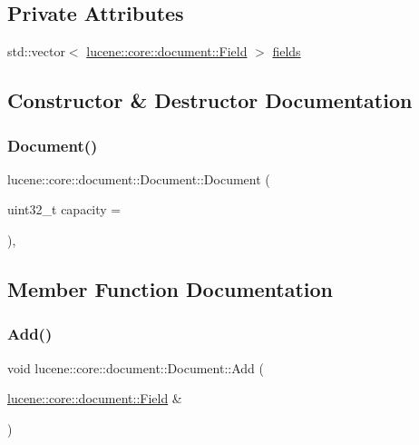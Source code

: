 \subsection*{Private Attributes}
\begin{DoxyCompactItemize}
\item 
std\+::vector$<$ \mbox{\hyperlink{classlucene_1_1core_1_1document_1_1Field}{lucene\+::core\+::document\+::\+Field}} $>$ \mbox{\hyperlink{classlucene_1_1core_1_1document_1_1Document_af9530ebe88523c7b14063d7efeccf987}{fields}}
\end{DoxyCompactItemize}


\subsection{Constructor \& Destructor Documentation}
\mbox{\label{classlucene_1_1core_1_1document_1_1Document_acd273693f28b42b99480204b5177dccc}} 
\subsubsection{\texorpdfstring{Document()}{Document()}}
{\footnotesize\ttfamily lucene\+::core\+::document\+::\+Document\+::\+Document (\begin{DoxyParamCaption}\item[{uint32\+\_\+t}]{capacity = {} }\end{DoxyParamCaption})\hspace{0.3cm}{\ttfamily [inline]}, {\ttfamily [explicit]}}



\subsection{Member Function Documentation}
\mbox{\label{classlucene_1_1core_1_1document_1_1Document_a0a2a27b34f85668dffba51957c13b02f}} 
\subsubsection{\texorpdfstring{Add()}{Add()}\hspace{0.1cm}{\footnotesize\ttfamily [1/2]}}
{\footnotesize\ttfamily void lucene\+::core\+::document\+::\+Document\+::\+Add (\begin{DoxyParamCaption}\item[{\mbox{\hyperlink{classlucene_1_1core_1_1document_1_1Field}{lucene\+::core\+::document\+::\+Field}} \&}]{ }\end{DoxyParamCaption})\hspace{0.3cm}{\ttfamily [delete]}}

